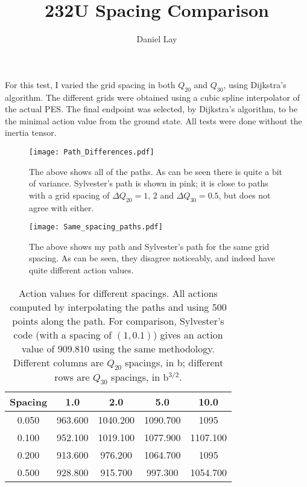\documentclass[]{article}
\title{232U Spacing Comparison}
\author{Daniel Lay}
\begin{document}
\maketitle
For this test, I varied the grid spacing in both $Q_{20}$ and $Q_{30}$, using Dijkstra's algorithm. The different grids were obtained using a cubic spline interpolator of the actual PES. The final endpoint was selected, by Dijkstra's algorithm, to be the minimal action value from the ground state. All tests were done without the inertia tensor.

\begin{figure}[h]
	\centering
	\texttt{[image: Path\_Differences.pdf]}
	\caption{The above shows all of the paths. As can be seen there is quite a bit of variance. Sylvester's path is shown in pink; it is close to paths with a grid spacing of $\Delta Q_{20}=1,\,2$ and $\Delta Q_{30}=0.5$, but does not agree with either.}
\end{figure}

\begin{figure}
	\centering
	\texttt{[image: Same\_spacing\_paths.pdf]}
	\caption{The above shows my path and Sylvester's path for the same grid spacing. As can be seen, they disagree noticeably, and indeed have quite different action values.}
\end{figure}


\begin{table}[h]
	\begin{center}
		\begin{tabular}{|c|cccc|}
			\hline
			Spacing & 1.0 & 2.0 & 5.0 & 10.0 \\
			\hline
			0.050 & 963.600 & 1040.200 & 1090.700 & 1095 \\
			0.100 & 952.100 & 1019.100 & 1077.900 & 1107.100 \\
			0.200 & 913.600 & 976.200 & 1064.700 & 1095 \\
			0.500 & 928.800 & 915.700 & 997.300 & 1054.700 \\
			\hline
		\end{tabular}
	\caption{Action values for different spacings. All actions computed by interpolating the paths and using 500 points along the path. For comparison, Sylvester's code (with a spacing of $(1,0.1)$) gives an action value of 909.810 using the same methodology. Different columns are $Q_{20}$ spacings, in b; different rows are $Q_{30}$ spacings, in b${}^{3/2}$.}
	\end{center}
\end{table}
\end{document}
